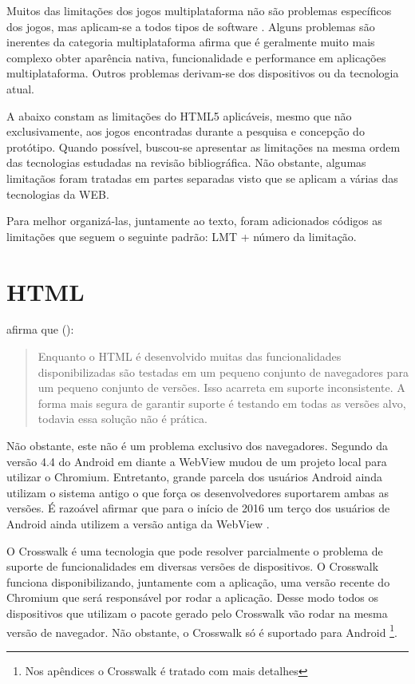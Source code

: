 
Muitos das limitações dos jogos multiplataforma não são
problemas específicos dos jogos, mas aplicam-se a todos tipos
de software \autocite[p. 3]{currentStateCrossPlatform}. Alguns
problemas são inerentes da categoria multiplataforma \cite[p.
7 ]{viabilityBusinessApplications} afirma que é geralmente muito
mais complexo obter aparência nativa, funcionalidade e performance
em aplicações multiplataforma. Outros problemas derivam-se dos
dispositivos ou da tecnologia atual.

A abaixo constam as limitações do HTML5 aplicáveis, mesmo que não
exclusivamente, aos jogos encontradas durante a pesquisa e concepção
do protótipo. Quando possível, buscou-se apresentar as limitações na
mesma ordem das tecnologias estudadas na revisão bibliográfica. Não
obstante, algumas limitaçãos foram tratadas em partes
separadas visto que se aplicam a várias das tecnologias da WEB.

Para melhor organizá-las, juntamente ao texto, foram adicionados códigos as limitações
 que seguem o seguinte padrão: LMT + número da limitação.


\section{HTML}

\citet{crossPlatformMobileGame} afirma que ():
\begin{quote}
Enquanto o HTML é desenvolvido muitas das funcionalidades
disponibilizadas são testadas em um pequeno conjunto de navegadores
para um pequeno conjunto de versões. Isso acarreta em suporte
inconsistente. A forma mais segura de garantir suporte é testando em
todas as versões alvo, todavia essa solução não é prática.
\end{quote}

Não obstante, este não é um problema exclusivo dos navegadores.  
Segundo \citet{chromeWebView} da versão 4.4 do Android em diante a
WebView mudou de um projeto local para utilizar o Chromium. Entretanto,
grande parcela dos usuários Android ainda utilizam o sistema antigo o
que força os desenvolvedores suportarem ambas as versões. É razoável
afirmar que para o início de 2016 um terço dos usuários de Android
ainda utilizem a versão antiga da WebView \citet{chromeWebView}.

O Crosswalk é uma tecnologia que pode resolver parcialmente o problema
de suporte de funcionalidades em diversas versões de dispositivos.
O Crosswalk funciona disponibilizando, juntamente com a aplicação,
uma versão recente do Chromium que será responsável por rodar a
aplicação. Desse modo todos os dispositivos que utilizam o pacote
gerado pelo Crosswalk vão rodar na mesma versão de navegador. Não
obstante, o Crosswalk só é suportado para Android \footnote{Nos
apêndices o Crosswalk é tratado com mais detalhes}.

